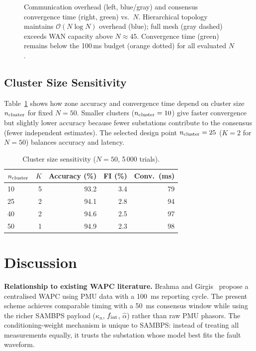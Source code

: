 \documentclass[journal]{IEEEtran}
\newcommand{\kappan}{\kappa_n}
\begin{document}
\begin{figure}[htbp]
  \centering
  
  \caption{Communication overhead (left, blue/gray) and consensus
           convergence time (right, green) vs.\ $N$.  Hierarchical
           topology maintains $\mathcal{O}(N\log N)$ overhead (blue);
           full mesh (gray dashed) exceeds WAN capacity above $N\approx45$.
           Convergence time (green) remains below the 100\,ms budget
           (orange dotted) for all evaluated $N$.}
  \label{fig:scalability}
\end{figure}

\subsection{Cluster Size Sensitivity}

Table~\ref{tab:cluster} shows how zone accuracy and convergence time
depend on cluster size $n_{\rm cluster}$ for fixed $N = 50$.
Smaller clusters ($n_{\rm cluster} = 10$) give faster convergence but
slightly lower accuracy because fewer substations contribute to the
consensus (fewer independent estimates).  The selected design point
$n_{\rm cluster} = 25$ ($K = 2$ for $N = 50$) balances accuracy and
latency.

\begin{table}[htbp]
  \centering
  \caption{Cluster size sensitivity ($N = 50$, 5\,000 trials).}
  \label{tab:cluster}
  \small
  \begin{tabular}{@{}lrrrr@{}}
    \toprule
    $n_{\rm cluster}$ & $K$ & Accuracy (\%) & FI (\%) & Conv.\ (ms) \\
    \midrule
    10 & 5 & 93.2 & 3.4 & 79 \\
    25 & 2 & 94.1 & 2.8 & 94 \\
    40 & 2 & 94.6 & 2.5 & 97 \\
    50 & 1 & 94.9 & 2.3 & 98 \\
    \bottomrule
  \end{tabular}
\end{table}

\section{Discussion}
\label{sec:discussion}

\textbf{Relationship to existing WAPC literature.}
Brahma and Girgis~\cite{Brahma2018WAPC} propose a centralised WAPC using
PMU data with a 100~ms reporting cycle.  The present scheme achieves
comparable timing with a 50~ms consensus window while using the richer
SAMBPS payload ($\kappan$, $f_{\rm int}$, $\hat{\alpha}$) rather than raw
PMU phasors.  The conditioning-weight mechanism is unique to SAMBPS:
instead of treating all measurements equally, it trusts the substation
whose model best fits the fault waveform.
\end{document}
